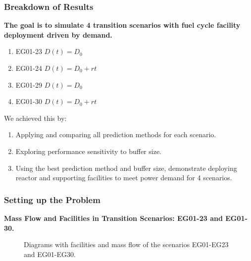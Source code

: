 \begin{frame}
    \frametitle{Breakdown of Results}
    \textbf{The goal is to simulate 4 transition scenarios with fuel cycle facility 
    deployment driven by demand.}  
    \begin{enumerate}
        \item EG01-23 $D(t)=D_0$
        \item EG01-24 $D(t)=D_0+rt$
        \item EG01-29 $D(t)=D_0$
        \item EG01-30 $D(t)=D_0+rt$
    \end{enumerate}

We achieved this by:
\begin{enumerate}
    \item Applying and comparing all prediction methods for each scenario. 
    \item Exploring performance sensitivity to buffer size.
    \item Using the best prediction method and buffer size, demonstrate \deploy 
    deploying reactor and supporting facilities to meet power demand 
    for 4 scenarios. 
\end{enumerate}

\end{frame}

\begin{frame}
    \frametitle{Setting up the Problem}
\textbf{Mass Flow and Facilities in Transition Scenarios: EG01-23 and EG01-30.}

    \begin{figure}[]
        \centering
        \hspace{1em}
        \caption{Diagrams with facilities and mass flow of the scenarios EG01-EG23 and EG01-EG30.}
        \label{fig:eg2330}
    \end{figure}
\end{frame}